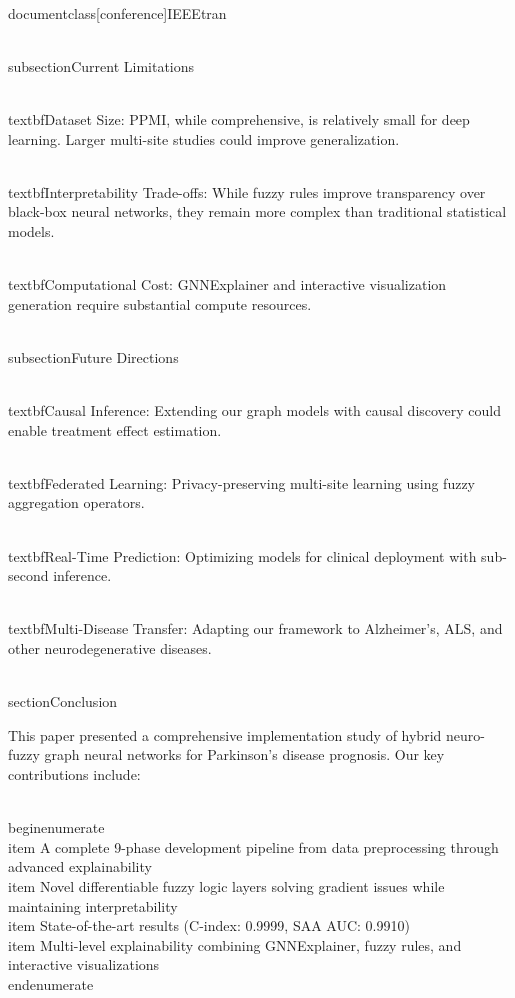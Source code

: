 \\documentclass[conference]{IEEEtran}
\begin{document}
\\subsection{Current Limitations}

\\textbf{Dataset Size:} PPMI, while comprehensive, is relatively small for deep learning. Larger multi-site studies could improve generalization.

\\textbf{Interpretability Trade-offs:} While fuzzy rules improve transparency over black-box neural networks, they remain more complex than traditional statistical models.

\\textbf{Computational Cost:} GNNExplainer and interactive visualization generation require substantial compute resources.

\\subsection{Future Directions}

\\textbf{Causal Inference:} Extending our graph models with causal discovery could enable treatment effect estimation.

\\textbf{Federated Learning:} Privacy-preserving multi-site learning using fuzzy aggregation operators.

\\textbf{Real-Time Prediction:} Optimizing models for clinical deployment with sub-second inference.

\\textbf{Multi-Disease Transfer:} Adapting our framework to Alzheimer's, ALS, and other neurodegenerative diseases.

\\section{Conclusion}

This paper presented a comprehensive implementation study of hybrid neuro-fuzzy graph neural networks for Parkinson's disease prognosis. Our key contributions include:

\\begin{enumerate}
    \\item A complete 9-phase development pipeline from data preprocessing through advanced explainability
    \\item Novel differentiable fuzzy logic layers solving gradient issues while maintaining interpretability
    \\item State-of-the-art results (C-index: 0.9999, SAA AUC: 0.9910)
    \\item Multi-level explainability combining GNNExplainer, fuzzy rules, and interactive visualizations
\\end{enumerate}
\end{document}
